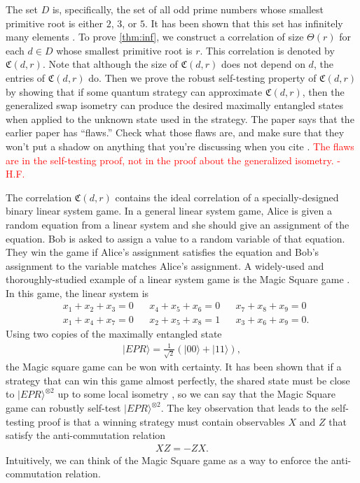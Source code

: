\documentclass[11pt,letterpaper]{article}
\newcommand{\ket}[1]{|#1\rangle}
\newcommand{\x}{\otimes}
\newcommand{\1}{\mathbb{1}}
\newcommand{\fC}{\mathfrak{C}}
\def\carl#1{{\color{blue} #1}}
\newcommand{\hfc}[1]{\textcolor{red}{#1 -H.F.}}
\newtheorem{theorem}{Theorem}[section]
\theoremstyle{definition}
\begin{document}
The set $D$ is, specifically, the set of all 
odd prime numbers whose smallest primitive root is either $2$, $3$, or $5$.  
It has been shown that this set has infinitely many elements \cite{murty1988}.
To prove \cref{thm:inf}, we construct a correlation of size $\Theta(r)$ 
for each $d \in D$ whose smallest primitive root is $r$.
This correlation is denoted by $\fC(d,r)$.
Note that although the size of $\fC(d,r)$ does not depend on $d$, the entries of $\fC(d,r)$ do.
Then we prove the robust self-testing property of $\fC(d,r)$ by showing 
that if some quantum strategy can approximate $\fC(d,r)$, then
the generalized swap isometry \cite{yang2013}
can produce the desired maximally entangled states when applied to the unknown state used in the strategy.
\carl{The paper \cite{bamps2015} says that the earlier paper \cite{yang2013} has ``flaws.'' Check what those flaws are, and make sure that they won't put a shadow on anything that you're discussing when you cite \cite{yang2013}.} 
\hfc{The flaws are in the self-testing proof, not in the 
proof about the generalized isometry.}

The correlation $\fC(d,r)$ contains the ideal correlation of a specially-designed binary linear system game.
In a general linear system game, Alice is given a random equation 
from a linear system and she
should give an assignment of the equation.
Bob is asked to assign a value to a random variable of that equation.
They win the game if Alice's assignment satisfies the equation and Bob's
assignment to the variable matches Alice's assignment.
A widely-used and thoroughly-studied example of a linear system game is
the Magic Square game \cite{magic_square}.
In this game, the linear system is
\begin{align*}
    &x_1 + x_2 + x_3 = 0 && x_4 + x_5 + x_6 = 0 &&
    x_7 + x_8 + x_9 = 0 \\
    &x_1 + x_4 + x_7 = 0 && x_2 + x_5 + x_8 = 1 &&
    x_3 + x_6 + x_9 = 0.
\end{align*}
Using two copies of the maximally entangled state
\begin{align*}
    \ket{EPR} = \frac{1}{\sqrt{2}}(\ket{00}+\ket{11}),
\end{align*}
the Magic square game can be won
with certainty.
It has been shown that if a strategy that can win this game almost perfectly, the shared state must be close to $\ket{EPR}^{\x 2}$ up to some local isometry \cite{wu2016}, 
so we can say that the Magic Square game can robustly self-test $\ket{EPR}^{\x 2}$.
The key observation that leads to the self-testing proof is that 
a winning strategy must contain observables $X$ and $Z$ that 
satisfy the anti-commutation relation 
\begin{align*}
    X Z = - Z X.
\end{align*}
Intuitively, we can think of the Magic Square game as a way to enforce the
anti-commutation relation.
\end{document}
